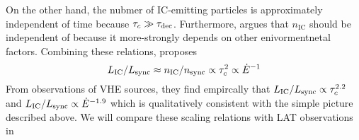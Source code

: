 On the other hand, the nubmer of \ac{IC}-emitting particles
is approximately independent of time because $\tau_c \gg
\tau_\text{dec}$.  Furthermore, \cite{mattana_2009_evolution-gamma-}
argues that $n_\text{IC}$ should be independent of \energydot because it
more-strongly depends on other enivormentnetal factors.  Combining these
relations, \cite{mattana_2009_evolution-gamma-} proposes
\begin{equation}
  L_\text{IC}/L_\text{sync} \approx n_\text{IC}/n_\text{sync}
  \propto \tau_c^2 \propto \dot{E}^{-1}
\end{equation}
From observations of \ac{VHE} sources, they find empircally
that $L_\text{IC}/L_\text{sync} \propto
\tau_c^{2.2}$ and $L_\text{IC}/L_\text{sync}
\propto \dot{E}^{-1.9}$ which is qualitatively consistent with the
simple picture described above.  We will compare these scaling relations
with \ac{LAT} observations in 

